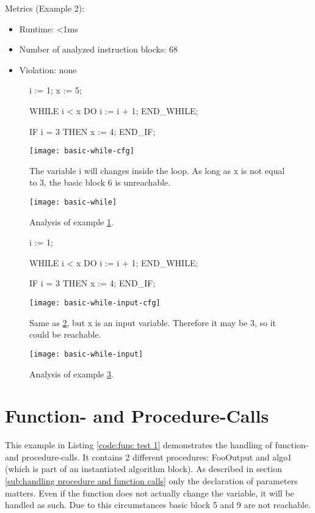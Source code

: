 Metrics (Example 2):
\begin{itemize}
	\item Runtime: <1ms
	\item Number of analyzed instruction blocks: 68
	\item Violation: none
\end{itemize}


\begin{figure}
	\begin{GenericCode}
i := 1;
x := 5;
		
WHILE i < x DO
	i := i + 1;
END_WHILE;
		
IF i = 3 THEN
	x := 4;
END_IF;	\end{GenericCode}
	\centering
	\texttt{[image: basic-while-cfg]}
	\caption{The variable i will changes inside the loop. As long as x is not equal to 3, the basic block 6 is unreachable. }
	\label{code:loop example 1 cfg}
\end{figure}
\begin{figure}
	\centering
	\texttt{[image: basic-while]}
	\caption{Analysis of example \ref{code:loop example 1 cfg}. }
	\label{code:loop example 1}
\end{figure}
\begin{figure}
	\begin{GenericCode}
i := 1;
		
WHILE i < x DO
	i := i + 1;
END_WHILE;
		
IF i = 3 THEN
	x := 4;
END_IF;		\end{GenericCode}
	\centering
	\texttt{[image: basic-while-input-cfg]}
	\caption{Same as \ref{code:loop example 1}, but x is an input variable. Therefore it may be 3, so it could be reachable.}
	\label{code:loop example 2 cfg}
\end{figure}
\begin{figure}
	\centering
	\texttt{[image: basic-while-input]}
	\caption{Analysis of example \ref{code:loop example 2 cfg}.}
	\label{code:loop example 2}
\end{figure}
\section{Function- and Procedure-Calls}
This example in Listing \ref{code:func test 1} demonstrates the handling of function- and procedure-calls. It contains 2 different procedures: FooOutput and algo1 (which is part of an instantiated algorithm block). 
As described in section \ref{sub:handling procedure and function calls} only the declaration of parameters matters. Even if the function does not actually change the variable, it will be handled as such. 
Due to this circumstances basic block 5 and 9 are not reachable.


